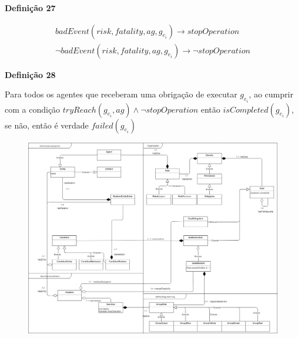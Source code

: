 \documentclass[12pt]{article}
\begin{document}
\textbf{Definição 27}

\begin{eqnarray}
	badEvent(risk,fatality,ag,g_{e_i}) \to stopOperation \\
	\neg badEvent(risk,fatality,ag,g_{e_i}) \to \neg stopOperation
\end{eqnarray}

\textbf{Definição 28}

Para todos os agentes que receberam uma obrigação de executar $g_{e_i}$, ao cumprir com a condição $ tryReach(g_{e_i},ag) \wedge \neg stopOperation $ então $ isCompleted(g_{e_i})$, se não, então é verdade $ failed(g_{e_i}) $

\begin{figure}
  \centering
  \includegraphics[width=0.8\linewidth]{umlmodel} 
\end{figure}
\end{document}
